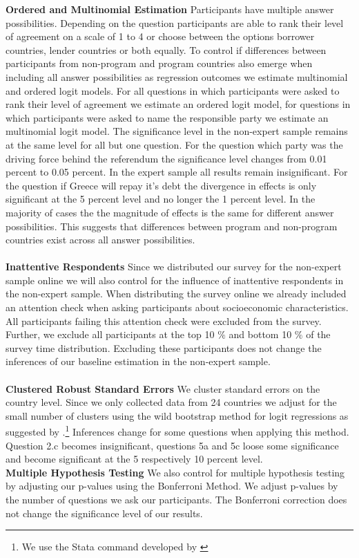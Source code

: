 \textbf{Ordered and Multinomial Estimation}
Participants have multiple answer possibilities. Depending on the question participants are able to rank their level of agreement on a scale of 1 to 4 or choose between the options borrower countries, lender countries or both equally. To control if differences between participants from non-program and program countries also emerge when including all answer possibilities as regression outcomes we estimate multinomial and ordered logit models. For all questions in which participants were asked to rank their level of agreement we estimate an ordered logit model, for questions in which participants were asked to name the responsible party we estimate an multinomial logit model. The significance level in the non-expert sample remains at the same level for all but one question. For the question which party was the driving force behind the referendum the significance level changes from 0.01 percent to 0.05 percent. In the expert sample all results remain insignificant. For the question if Greece will repay it's debt the divergence in effects is only significant at the 5 percent level and no longer the 1 percent level. In the majority of cases the the magnitude of effects is the same for different answer possibilities. This suggests that differences between program and non-program countries exist across all answer possibilities. \\

\\
\textbf{Inattentive Respondents}
Since we distributed our survey for the non-expert sample online we will also control for the influence of inattentive respondents in the non-expert sample. When distributing the survey online we already included an attention check when asking participants about socioeconomic characteristics. All participants failing this attention check were excluded from the survey. Further, we exclude all participants at the top 10 $\%$ and bottom 10 $\%$ of the survey time distribution. Excluding these participants does not change the inferences of our baseline estimation in the non-expert sample.\\


\\
\textbf{Clustered Robust Standard Errors} 
We cluster standard errors on the country level. Since we only collected data from 24 countries we adjust for the small number of clusters using the wild bootstrap method for logit regressions as suggested by \cite{cameron}.\footnote{We use the Stata command developed by \cite{roodman}} Inferences change for some questions when applying this method. Question 2.c becomes insignificant, questions 5a and 5c loose some significance and become significant at the 5 respectively 10 percent level.  \\

\textbf{Multiple Hypothesis Testing}
We also control for multiple hypothesis testing by adjusting our p-values using the Bonferroni Method. We adjust p-values by the number of questions we ask our participants. The Bonferroni correction does not change the significance level of our results. 

